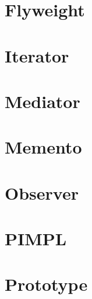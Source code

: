 \let\mypdfximage\pdfximage\def\pdfximage{\immediate\mypdfximage}\documentclass[twoside]{book}
\newcommand{\+}{\discretionary{\mbox{\scriptsize$\hookleftarrow$}}{}{}}
\begin{document}
\chapter{Flyweight}
\label{md__d_1__g_i_t__practice__design_patterns__flyweight__r_e_a_d_m_e}

\chapter{Iterator}
\label{md__d_1__g_i_t__practice__design_patterns__iterator__r_e_a_d_m_e}

\chapter{Mediator}
\label{md__d_1__g_i_t__practice__design_patterns__mediator__r_e_a_d_m_e}

\chapter{Memento}
\label{md__d_1__g_i_t__practice__design_patterns__memento__r_e_a_d_m_e}

\chapter{Observer}
\label{md__d_1__g_i_t__practice__design_patterns__observer__r_e_a_d_m_e}

\chapter{P\+I\+M\+PL}
\label{md__d_1__g_i_t__practice__design_patterns__p_i_m_p_l__r_e_a_d_m_e}

\chapter{Prototype}
\label{md__d_1__g_i_t__practice__design_patterns__prototype__r_e_a_d_m_e}

\end{document}
